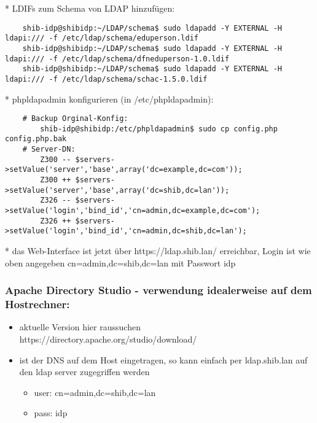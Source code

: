 * LDIFs zum Schema von LDAP hinzufügen:
\begin{lstlisting}
	shib-idp@shibidp:~/LDAP/schema$ sudo ldapadd -Y EXTERNAL -H ldapi:/// -f /etc/ldap/schema/eduperson.ldif
	shib-idp@shibidp:~/LDAP/schema$ sudo ldapadd -Y EXTERNAL -H ldapi:/// -f /etc/ldap/schema/dfneduperson-1.0.ldif
	shib-idp@shibidp:~/LDAP/schema$ sudo ldapadd -Y EXTERNAL -H ldapi:/// -f /etc/ldap/schema/schac-1.5.0.ldif
\end{lstlisting}
* phpldapadmin konfigurieren (in /etc/phpldapadmin):
\begin{lstlisting}
	# Backup Orginal-Konfig:
		shib-idp@shibidp:/etc/phpldapadmin$ sudo cp config.php config.php.bak
	# Server-DN:
		Z300 -- $servers->setValue('server','base',array('dc=example,dc=com'));
		Z300 ++ $servers->setValue('server','base',array('dc=shib,dc=lan'));
		Z326 -- $servers->setValue('login','bind_id','cn=admin,dc=example,dc=com');
		Z326 ++ $servers->setValue('login','bind_id','cn=admin,dc=shib,dc=lan');
\end{lstlisting}
* das Web-Interface ist jetzt über https://ldap.shib.lan/ erreichbar, Login ist wie oben angegeben cn=admin,dc=shib,dc=lan mit Passwort idp

\subsubsection*{Apache Directory Studio - verwendung idealerweise auf dem
Hostrechner:}
\begin{itemize}
  \item aktuelle Version hier raussuchen
  https://directory.apache.org/studio/download/
  \item ist der DNS auf dem Host eingetragen, so kann einfach per ldap.shib.lan auf den ldap server zugegriffen werden
  \begin{itemize}
		\item user: cn=admin,dc=shib,dc=lan
		\item pass: idp
\end{itemize}
\end{itemize}
